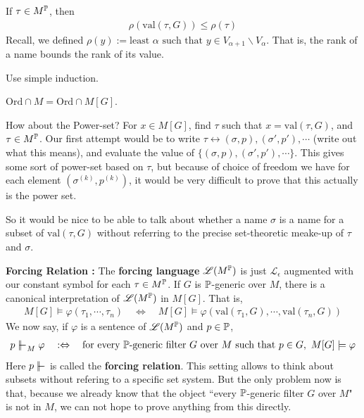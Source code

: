 \documentclass[12pt,a4paper]{article}
\newenvironment{proof}
{\begin{changemargin}{0.5cm}{0.5cm} 
	}%
	{\end{changemargin}
}
\newenvironment{p}
{\begin{proof} 
	}%
	{\end{proof}
}
\begin{document}
\lem If $\tau \in M^{\mathbb{P}}$, then
\begin{align*}
\rho(\text{val}(\tau, G)) \leq \rho(\tau)
\end{align*}
Recall, we defined $\rho(y) :=\text{least } \alpha \text{ such that } y \in V_{\alpha +1}\backslash V_{\alpha}$. That is, the rank of a name bounds the rank of its value.
\begin{p}
\pf Use simple induction.
\end{p}
\s

\corr $\text{Ord} \cap M = \text{Ord} \cap M[G]$. 
\s

How about the Power-set? For $x\in M[G]$, find $\tau$ such that $x= \text{val}(\tau, G)$, and $\tau \in M^{\mathbb{P}}$. Our first attempt would be to write $\tau \leftrightarrow (\sigma, p), (\sigma', p'), \cdots$ (write out what this means), and evaluate the value of $\{ (\sigma, p), (\sigma', p'), \cdots \}$. This gives some sort of power-set based on $\tau$, but because of choice of freedom we have for each element $(\sigma^{(k)}, p^{(k)})$, it would be very difficult to prove that this actually is the power set.

\quad So it would be nice to be able to talk about whether a name $\sigma$ is a name for a subset of $\text{val}(\tau, G)$ without referring to the precise set-theoretic meake-up of $\tau$ and $\sigma$. 
\s

\textbf{Forcing Relation :} The \textbf{forcing language} $\mathscr{L}(M^{\mathbb{P}})$ is just $\mathscr{L}_{\epsilon}$ augmented with our constant symbol for each $\tau \in M^{\mathbb{P}}$. If $G$ is $\mathbb{P}$-generic over $M$, there is a canonical interpretation of $\mathscr{L}(M^{\mathbb{P}})$ in $M[G]$. That is,
\begin{align*}
M[G] \models \varphi(\tau_1, \cdots, \tau_n) \quad \Leftrightarrow \quad M[G] \models \varphi(\text{val}(\tau_1, G), \cdots, \text{val}(\tau_n, G))
\end{align*}
We now say, if $\varphi$ is a sentence of $\mathscr{L}(M^{\mathbb{P}})$ and $p\in \mathbb{P}$,
\begin{align*}
p\forces_M \varphi \quad :\Leftrightarrow \quad \text{for every } \poset\text{-generic filter } G \text{ over } M \text{ such that } p\in G, \,\, M[G] \models \varphi
\end{align*}
Here $p\forces$ is called the \textbf{forcing relation}. This setting allows to think about subsets without refering to a specific set system. But the only problem now is that, because we already know that the object ``every $\mathbb{P}$-generic filter $G$ over $M$" is not in $M$, we can not hope to prove anything from this directly.
\s
\end{document}
